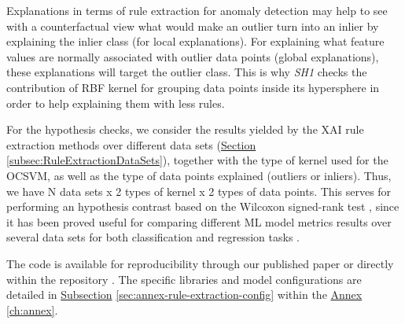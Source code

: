 Explanations in terms of rule extraction for anomaly detection may help to see with a counterfactual view what would make an outlier turn into an inlier by explaining the inlier class (for local explanations). For explaining what feature values are normally associated with outlier data points (global explanations), these explanations will target the outlier class. This is why \textit{SH1} checks the contribution of RBF kernel for grouping data points inside its hypersphere in order to help explaining them with less rules.

For the hypothesis checks, we consider the results yielded by the XAI rule extraction methods over different data sets (\hyperref[subsec:RuleExtractionDataSets]{Section} \ref{subsec:RuleExtractionDataSets}), together with the type of kernel used for the OCSVM, as well as the type of data points explained (outliers or inliers). Thus, we have N data sets x 2 types of kernel x 2 types of data points. This serves for performing an hypothesis contrast based on the Wilcoxon signed-rank test \parencite{conover1998practical}, since it has been proved useful for comparing different ML model metrics results over several data sets for both classification \parencite{demvsar2006statistical} and regression tasks \parencite{trawinski2012nonparametric}.

The code is available for reproducibility through our published paper \parencite{barbado2022rule} or directly within the repository \parencite{Barbado2019}. The specific libraries and model configurations are detailed in \hyperref[sec:annex-rule-extraction-config]{Subsection} \ref{sec:annex-rule-extraction-config} within the \hyperref[ch:annex]{Annex} \ref{ch:annex}.

